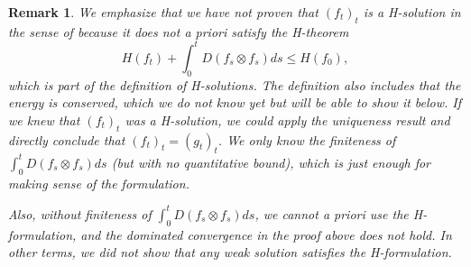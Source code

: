 \documentclass[11pt,a4paper]{article}
\theoremstyle{definition}
\theoremstyle{plain}
\newtheorem{remark}[defi]{Remark}
\begin{document}
\begin{remark}
\label{rem:hsol}
    We emphasize that we have \textit{not} proven that $(f_t)_t$ is a H-solution in the sense of \cite{Villani1998} because it does not a priori satisfy the H-theorem
    $$H(f_t)+\int_0^t D(f_s\otimes f_s)ds \leq H(f_0),$$
    which is part of the definition of H-solutions. The definition also includes that the energy is conserved, which we do not know yet but will be able to show it below. If we knew that $(f_t)_t$ was a H-solution, we could apply the uniqueness result \cite{Tabary2025} and directly conclude that $(f_t)_t=(g_t)_t$. We only know the finiteness of $\int_0^t D(f_s\otimes f_s)ds$ (but with no quantitative bound), which is just enough for making sense of the formulation.

    Also, without finiteness of $\int_0^t D(f_s\otimes f_s)ds$, we cannot a priori use the H-formulation, and the dominated convergence in the proof above does not hold. In other terms, we did \textit{not} show that any weak solution satisfies the H-formulation.
\end{remark}
\end{document}
